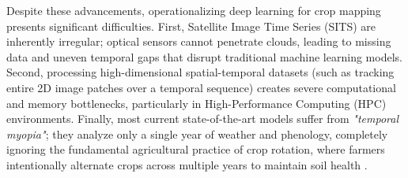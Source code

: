 Despite these advancements, operationalizing deep learning for crop mapping presents significant difficulties.
First, Satellite Image Time Series (SITS) are inherently irregular; optical sensors cannot penetrate clouds,
leading to missing data and uneven temporal gaps that disrupt traditional machine learning models.
Second, processing high-dimensional spatial-temporal datasets (such as tracking entire 2D image patches over a temporal sequence) creates
severe computational and memory bottlenecks, particularly in High-Performance Computing (HPC) environments.
Finally, most current state-of-the-art models suffer from \textit{"temporal myopia"}; they analyze only a single year of weather and phenology,
completely ignoring the fundamental agricultural practice of crop rotation,
where farmers intentionally alternate crops across multiple years to maintain soil health \cite{crop_rotation}.

